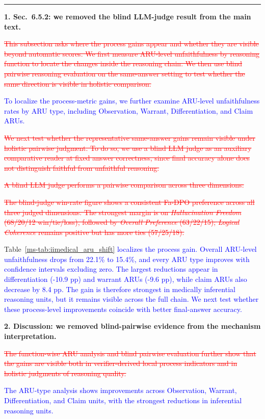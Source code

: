 \documentclass[12pt]{article}
\newcommand{\deleted}[1]{\textcolor{red}{\sout{#1}}}
\newcommand{\added}[1]{\textcolor{blue}{#1}}
\newcommand{\responseheading}[1]{%
    \vspace{0.24cm}
    \par\noindent{\large\bfseries #1}\par
    \vspace{0.03cm}
    \noindent\rule{\linewidth}{0.35pt}\par
    \vspace{0.06cm}
    \noindent\ignorespaces
}
\begin{document}
\responseheading{Revision Details}
\textbf{1. Sec.~6.5.2: we removed the blind LLM-judge result from the main text.}

\begin{displayquote}
\deleted{This subsection asks where the process gains appear and whether they are visible beyond automatic scores. We first measure ARU-level unfaithfulness by reasoning function to locate the changes inside the reasoning chain. We then use blind pairwise reasoning evaluation on the same-answer setting to test whether the same direction is visible in holistic comparison.}

\added{To localize the process-metric gains, we further examine ARU-level unfaithfulness rates by ARU type, including Observation, Warrant, Differentiation, and Claim ARUs.}

\deleted{We next test whether the representative same-answer gains remain visible under holistic pairwise judgment. To do so, we use a blind LLM judge as an auxiliary comparative reader at fixed answer correctness, since final accuracy alone does not distinguish faithful from unfaithful reasoning.}

\deleted{A blind LLM judge performs a pairwise comparison across three dimensions:}

\deleted{The blind-judge win-rate figure shows a consistent Fa-DPO preference across all three judged dimensions. The strongest margin is on \textit{Hallucination Freedom} (68/20/12 win/tie/loss), followed by \textit{Overall Preference} (63/22/15); \textit{Logical Coherence} remains positive but has more ties (57/25/18).}

Table~\ref*{ms-tab:iimedical_aru_shift} \added{localizes the process gain. Overall ARU-level unfaithfulness drops from 22.1\% to 15.4\%, and every ARU type improves with confidence intervals excluding zero. The largest reductions appear in differentiation (-10.9 pp) and warrant ARUs (-9.6 pp), while claim ARUs also decrease by 8.4 pp. The gain is therefore strongest in medically inferential reasoning units, but it remains visible across the full chain. We next test whether these process-level improvements coincide with better final-answer accuracy.}
\end{displayquote}

\textbf{2. Discussion: we removed blind-pairwise evidence from the mechanism interpretation.}

\begin{displayquote}
\deleted{The function-wise ARU analysis and blind pairwise evaluation further show that the gains are visible both in verifier-derived local process indicators and in holistic judgments of reasoning quality.}

\added{The ARU-type analysis shows improvements across Observation, Warrant, Differentiation, and Claim units, with the strongest reductions in inferential reasoning units.}
\end{displayquote}
\end{document}
